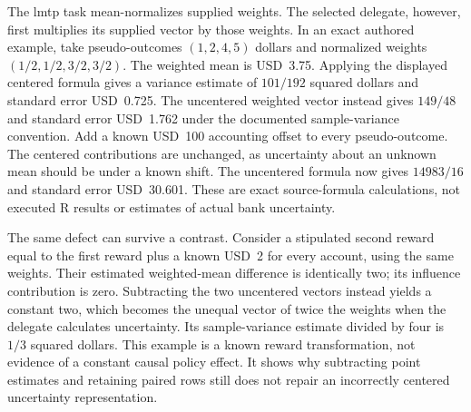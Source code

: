 The lmtp task mean-normalizes supplied weights. The selected delegate,
however, first multiplies its supplied vector by those weights. In an exact
authored example, take pseudo-outcomes $(1,2,4,5)$ dollars and normalized
weights $(1/2,1/2,3/2,3/2)$. The weighted mean is USD~3.75. Applying the
displayed centered formula gives a variance estimate of $101/192$ squared
dollars and standard error USD~0.725. The uncentered weighted vector instead
gives $149/48$ and standard error USD~1.762 under the documented sample-variance
convention. Add a known USD~100 accounting offset to every pseudo-outcome.
The centered contributions are unchanged, as uncertainty about an unknown
mean should be under a known shift. The uncentered formula now gives
$14983/16$ and standard error USD~30.601. These are exact source-formula
calculations, not executed R results or estimates of actual bank uncertainty.
\citep{rel23ife,rel23ifecaller,rel23ifewitness}

The same defect can survive a contrast. Consider a stipulated second reward
equal to the first reward plus a known USD~2 for every account, using the
same weights. Their estimated weighted-mean difference is identically two;
its influence contribution is zero. Subtracting the two uncentered vectors
instead yields a constant two, which becomes the unequal vector of twice
the weights when the delegate calculates uncertainty. Its sample-variance
estimate divided by four is $1/3$ squared dollars. This example is a known
reward transformation, not evidence of a constant causal policy effect. It
shows why subtracting point estimates and retaining paired rows still does
not repair an incorrectly centered uncertainty representation.
\citep{rel23ifewitness}


